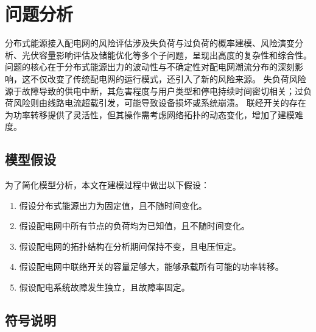 \documentclass{article}
\begin{document}
\section{问题分析}\label{sec:analysis}

分布式能源接入配电网的风险评估涉及失负荷与过负荷的概率建模、风险演变分析、光伏容量影响评估及储能优化等多个子问题，呈现出高度的复杂性和综合性。
问题的核心在于分布式能源出力的波动性与不确定性对配电网潮流分布的深刻影响，这不仅改变了传统配电网的运行模式，还引入了新的风险来源。
失负荷风险源于故障导致的供电中断，其危害程度与用户类型和停电持续时间密切相关；过负荷风险则由线路电流超载引发，可能导致设备损坏或系统崩溃。
联经开关的存在为功率转移提供了灵活性，但其操作需考虑网络拓扑的动态变化，增加了建模难度。

\subsection{模型假设}\label{subsec:assumption}

为了简化模型分析，本文在建模过程中做出以下假设：

\begin{enumerate}
  \item 假设分布式能源出力为固定值，且不随时间变化。\label{assumption:fixed_output}
  \item 假设配电网中所有节点的负荷均为已知值，且不随时间变化。\label{assumption:fixed_load}
  \item 假设配电网的拓扑结构在分析期间保持不变，且电压恒定。\label{assumption:topology_fixed}
  \item 假设配电网中联络开关的容量足够大，能够承载所有可能的功率转移。\label{assumption:large_capacity}
  \item 假设配电系统故障发生独立，且故障率固定。\label{assumption:independent_failure}
\end{enumerate}

\subsection{符号说明}\label{subsec:notation}
\end{document}
